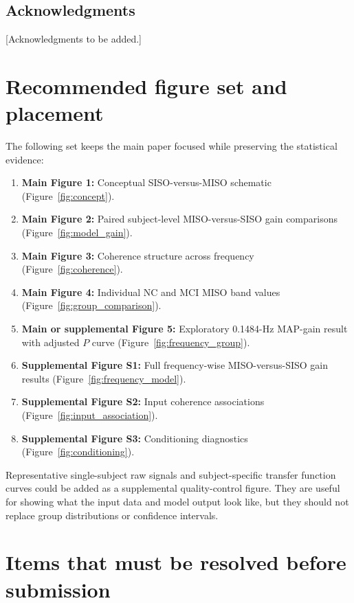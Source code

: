 \documentclass[12pt]{article}
\begin{document}
\subsection*{Acknowledgments}
[Acknowledgments to be added.]

\appendix
\section{Recommended figure set and placement}

The following set keeps the main paper focused while preserving the statistical
evidence:

\begin{enumerate}[leftmargin=0.45in]
    \item \textbf{Main Figure 1:} Conceptual SISO-versus-MISO schematic
    (Figure~\ref{fig:concept}).
    \item \textbf{Main Figure 2:} Paired subject-level MISO-versus-SISO gain
    comparisons (Figure~\ref{fig:model_gain}).
    \item \textbf{Main Figure 3:} Coherence structure across frequency
    (Figure~\ref{fig:coherence}).
    \item \textbf{Main Figure 4:} Individual NC and MCI MISO band values
    (Figure~\ref{fig:group_comparison}).
    \item \textbf{Main or supplemental Figure 5:} Exploratory 0.1484-Hz
    MAP-gain result with adjusted $P$ curve (Figure~\ref{fig:frequency_group}).
    \item \textbf{Supplemental Figure S1:} Full frequency-wise MISO-versus-SISO
    gain results (Figure~\ref{fig:frequency_model}).
    \item \textbf{Supplemental Figure S2:} Input coherence associations
    (Figure~\ref{fig:input_association}).
    \item \textbf{Supplemental Figure S3:} Conditioning diagnostics
    (Figure~\ref{fig:conditioning}).
\end{enumerate}

Representative single-subject raw signals and subject-specific transfer
function curves could be added as a supplemental quality-control figure. They
are useful for showing what the input data and model output look like, but they
should not replace group distributions or confidence intervals.

\section{Items that must be resolved before submission}
\end{document}
